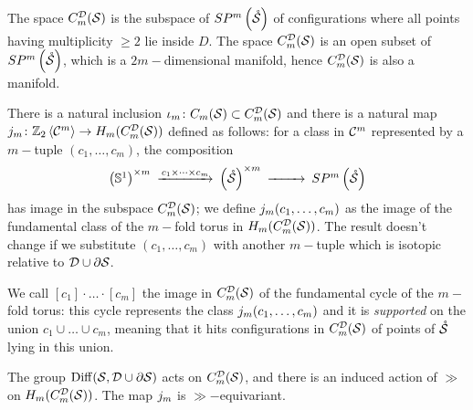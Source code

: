% 
\begin{defn}
 \label{defn:cmsD}
 The space $C_{m}^{\mathcal{D}}(\mathcal{S})$ is the subspace of $SP^{m}\left(\mathring{\mathcal{S}}\right)$ of configurations where all points
 having multiplicity $\geq 2$ lie inside $D$. The space $C_{m}^{\mathcal{D}}(\mathcal{S})$ is an open subset
 of $SP^m\left(\mathring{\mathcal{S}}\right)$, which is a $2m-$dimensional manifold, hence $C_{m}^{\mathcal{D}}(\mathcal{S})$ is also a manifold.
 
 There is a natural inclusion $\iota_m\colon C_m(\mathcal{S})\subset C_{m}^{\mathcal{D}}(\mathcal{S})$ and there is a natural map
  $j_m\colon \mathbb{Z}_2\left<\mathcal{C}^{m}\right>\to H_m(C_{m}^{\mathcal{D}}(\mathcal{S}))$ defined as follows: for a class in $\mathcal{C}^m$ represented
  by a $m-$tuple $(c_1,\dots,c_m)$, the composition
  \[
   \begin{CD}
    \pa{\Sone}^{\times m} @>c_1\times\dots\times c_m >> \pa{\mrS}^{\times m} @>>> \SP^m\pa{\mrS}
   \end{CD}
  \]
has image in the subspace $C_{m}^{\mathcal{D}}(\mathcal{S})$; we define $j_m(c_1,\dots,c_m)$ as the image
of the fundamental class
of the $m-$fold torus in $H_m(C_{m}^{\mathcal{D}}(\mathcal{S}))$. The result doesn't change
if we substitute $(c_1,\dots,c_m)$ with another $m-$tuple which is isotopic relative
to $\mathcal{D}\cup \partial\mathcal{S}$.

We call $[c_1]\cdot\ldots\cdot[c_m]$ the image in $C_{m}^{\mathcal{D}}(\mathcal{S})$ of the fundamental cycle of the
$m-$fold torus: this cycle represents the class $j_m(c_1,\dots,c_m)$ and it is \emph{supported}
on the union $c_1\cup\dots\cup c_m$, meaning that it hits configurations in $C_{m}^{\mathcal{D}}(\mathcal{S})$ of points of $\mathring{\mathcal{S}}$
lying in this union.

The group $\operatorname{Diff}(\mathcal{S},\mathcal{D}\cup\partial\mathcal{S})$ acts on $C_{m}^{\mathcal{D}}(\mathcal{S})$, and there is an induced action of $\gg$
on $H_m(C_{m}^{\mathcal{D}}(\mathcal{S}))$. The map $j_m$ is $\gg-$equivariant.
\end{defn}

